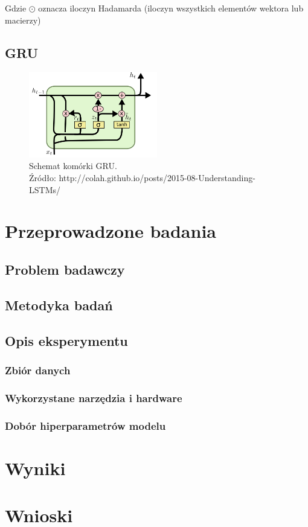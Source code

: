 \documentclass[oneside, mag]{mgr}
\begin{document}
Gdzie $\odot$ oznacza iloczyn Hadamarda (iloczyn wszystkich elementów wektora lub macierzy)


\section{GRU}

\begin{figure}
\centering
	\includegraphics[width=0.5\textwidth]{img/LSTM3-var-GRU.png}
	\caption{Schemat komórki GRU.\\ Źródło: http://colah.github.io/posts/2015-08-Understanding-LSTMs/}
	\label{fig:gru}
\end{figure}

\chapter{Przeprowadzone badania}


\section{Problem badawczy}

\section{Metodyka badań}


\section{Opis eksperymentu}

\subsection{Zbiór danych}

\subsection{Wykorzystane narzędzia i hardware}

\subsection{Dobór hiperparametrów modelu}


\chapter{Wyniki}


\chapter{Wnioski}



\tableofcontents

\listoffigures
\end{document}
